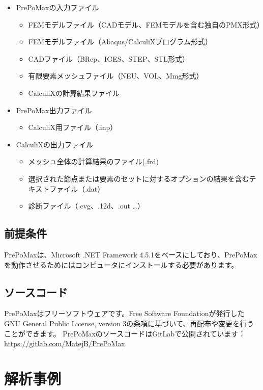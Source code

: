 \documentclass[a4j,20pt,slide]{ltjsarticle}
\begin{document}
\begin{itemize}
	\item PrePoMaxの入力ファイル
	      \begin{itemize}
		      \item FEMモデルファイル（CADモデル、FEMモデルを含む独自のPMX形式）
		      \item FEMモデルファイル（Abaqus/CalculiXプログラム形式）
		      \item CADファイル（BRep、IGES、STEP、STL形式）
		      \item 有限要素メッシュファイル（NEU、VOL、Mmg形式）
		      \item CalculiXの計算結果ファイル
	      \end{itemize}
	\item PrePoMax出力ファイル
	      \begin{itemize}
		      \item CalculiX用ファイル（.inp）
	      \end{itemize}
	\item CalculiXの出力ファイル
	      \begin{itemize}
		      \item メッシュ全体の計算結果のファイル(.frd)
		      \item 選択された節点または要素のセットに対するオプションの結果を含むテキストファイル（.dat）
		      \item 診断ファイル（.cvg、.12d、.out \ldots）
	      \end{itemize}
\end{itemize}
%
\subsection{前提条件}
PrePoMaxは、Microsoft .NET Framework 4.5.1をベースにしており、PrePoMaxを動作させるためにはコンピュータにインストールする必要があります。
\subsection{ソースコード}
PrePoMaxはフリーソフトウェアです。Free Software Foundationが発行したGNU General Public License, version 3の条項に基づいて、再配布や変更を行うことができます。
PrePoMaxのソースコードはGitLabで公開されています： \href{https://gitlab.com/MatejB/PrePoMax}{https://gitlab.com/MatejB/PrePoMax}
%
\section{解析事例}
\end{document}
